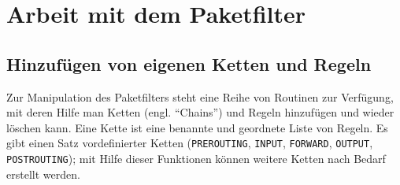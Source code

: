 
\providecommand{\fwaction}[1]{{\small\textsf{#1}}}
\providecommand{\fwchain}[1]{\texttt{#1}}
\providecommand{\fwtable}[1]{\textsc{#1}}
\providecommand{\fwmatch}[1]{\texttt{#1}}
\providecommand{\fwpktstate}[1]{\texttt{#1}}
\providecommand{\fwloglevel}[1]{\texttt{#1}}

\section{Arbeit mit dem Paketfilter}
\subsection{Hinzufügen von eigenen Ketten und Regeln}

Zur Manipulation des Paketfilters steht eine Reihe von Routinen zur
Verfügung, mit deren Hilfe man Ketten (engl. "`Chains"') und Regeln hinzufügen
und wieder löschen kann. Eine Kette ist eine benannte und geordnete Liste von
Regeln. Es gibt einen Satz vordefinierter Ketten (\fwchain{PREROUTING},
\fwchain{INPUT}, \fwchain{FORWARD}, \fwchain{OUTPUT}, \fwchain{POSTROUTING});
mit Hilfe dieser Funktionen können weitere Ketten nach Bedarf erstellt werden.

